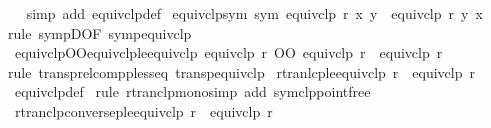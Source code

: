 \begin{isabellebody}
%
\isadelimproof
\ \ %
\endisadelimproof
%
\isatagproof
{}\isamarkupfalse%
{\isacharparenleft}{\kern0pt}simp\ add{\isacharcolon}{\kern0pt}\ equivclp{\isacharunderscore}{\kern0pt}def{\isacharparenright}{\kern0pt}%
\endisatagproof
{\isafoldproof}%
%
\isadelimproof
\isanewline
%
\endisadelimproof
\isanewline
{}\isamarkupfalse%
\ equivclp{\isacharunderscore}{\kern0pt}sym\ {\isacharbrackleft}{\kern0pt}sym{\isacharbrackright}{\kern0pt}{\isacharcolon}{\kern0pt}\ {\isachardoublequoteopen}equivclp\ r\ x\ y\ {\isasymLongrightarrow}\ equivclp\ r\ y\ x{\isachardoublequoteclose}\isanewline
%
\isadelimproof
\ \ %
\endisadelimproof
%
\isatagproof
{}\isamarkupfalse%
{\isacharparenleft}{\kern0pt}rule\ sympD{\isacharbrackleft}{\kern0pt}OF\ symp{\isacharunderscore}{\kern0pt}equivclp{\isacharbrackright}{\kern0pt}{\isacharparenright}{\kern0pt}%
\endisatagproof
{\isafoldproof}%
%
\isadelimproof
\isanewline
%
\endisadelimproof
\isanewline
{}\isamarkupfalse%
\ equivclp{\isacharunderscore}{\kern0pt}OO{\isacharunderscore}{\kern0pt}equivclp{\isacharunderscore}{\kern0pt}le{\isacharunderscore}{\kern0pt}equivclp{\isacharcolon}{\kern0pt}\ {\isachardoublequoteopen}equivclp\ r\ OO\ equivclp\ r\ {\isasymle}\ equivclp\ r{\isachardoublequoteclose}\isanewline
%
\isadelimproof
\ \ %
\endisadelimproof
%
\isatagproof
{}\isamarkupfalse%
{\isacharparenleft}{\kern0pt}rule\ transp{\isacharunderscore}{\kern0pt}relcompp{\isacharunderscore}{\kern0pt}less{\isacharunderscore}{\kern0pt}eq\ transp{\isacharunderscore}{\kern0pt}equivclp{\isacharparenright}{\kern0pt}{\isacharplus}{\kern0pt}%
\endisatagproof
{\isafoldproof}%
%
\isadelimproof
\isanewline
%
\endisadelimproof
\isanewline
{}\isamarkupfalse%
\ rtranlcp{\isacharunderscore}{\kern0pt}le{\isacharunderscore}{\kern0pt}equivclp{\isacharcolon}{\kern0pt}\ {\isachardoublequoteopen}r\isactrlsup {\isacharasterisk}{\kern0pt}\isactrlsup {\isacharasterisk}{\kern0pt}\ {\isasymle}\ equivclp\ r{\isachardoublequoteclose}\isanewline
%
\isadelimproof
\ \ %
\endisadelimproof
%
\isatagproof
{}\isamarkupfalse%
\ equivclp{\isacharunderscore}{\kern0pt}def\ \isamarkupfalse%
{\isacharparenleft}{\kern0pt}rule\ rtranclp{\isacharunderscore}{\kern0pt}mono{\isacharparenright}{\kern0pt}{\isacharparenleft}{\kern0pt}simp\ add{\isacharcolon}{\kern0pt}\ symclp{\isacharunderscore}{\kern0pt}pointfree{\isacharparenright}{\kern0pt}%
\endisatagproof
{\isafoldproof}%
%
\isadelimproof
\isanewline
%
\endisadelimproof
\isanewline
{}\isamarkupfalse%
\ rtranclp{\isacharunderscore}{\kern0pt}conversep{\isacharunderscore}{\kern0pt}le{\isacharunderscore}{\kern0pt}equivclp{\isacharcolon}{\kern0pt}\ {\isachardoublequoteopen}r{\isasyminverse}{\isasyminverse}\isactrlsup {\isacharasterisk}{\kern0pt}\isactrlsup {\isacharasterisk}{\kern0pt}\ {\isasymle}\ equivclp\ r{\isachardoublequoteclose}\isanewline

\end{isabellebody}
